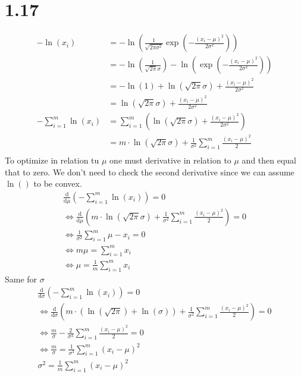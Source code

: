\documentclass[12pt,paper=a4,twoside]{scrartcl}
\begin{document}
\section*{1.17}
\begin{align*}   
     -\ln(x_i) &= -\ln\left( \frac{1}{\sqrt{2\pi\sigma^2}}\exp\left( -\frac{(x_i - \mu)^2}{2\sigma^2} \right) \right)\\   
     &= -\ln\left( \frac{1}{\sqrt{2\pi}\sigma}\right) - \ln\left(\exp\left(-\frac{(x_i -\mu)^2}{2\sigma^2}\right)\right)\\   
     &= -\ln(1) + \ln(\sqrt{2\pi}\sigma) + \frac{(x_i - \mu)^2}{2\sigma^2}\\   
     &= \ln(\sqrt{2\pi}\sigma) + \frac{(x_i - \mu)^2}{2\sigma^2}\\   
     -\sum_{i=1}^m \ln(x_i) &= \sum_{i=1}^m \left(\ln(\sqrt{2\pi}\sigma) + \frac{(x_i - \mu)^2}{2\sigma^2}\right)\\   
     &= m \cdot \ln(\sqrt{2\pi}\sigma) + \frac{1}{\sigma^2}\sum_{i=1}^m \frac{(x_i - \mu)^2}{2}\\   
     \end{align*}   
     To optimize in relation tu $\mu$ one must derivative in relation to $\mu$ and then equal that to zero.    
     We don't need to check the second derivative since we can assume $\ln()$ to be convex.   
     \begin{gather*}   
     \frac{\mathrm{d}}{\mathrm{d}\mu}\left(-\sum_{i=1}^m \ln(x_i)\right) = 0\\   
     \Leftrightarrow \frac{\mathrm{d}}{\mathrm{d}\mu} \left(m \cdot \ln(\sqrt{2\pi}\sigma) + \frac{1}{\sigma^2}\sum_{i=1}^m \frac{(x_i - \mu)^2}{2}\right) = 0\\   
     \Leftrightarrow\frac{1}{\sigma^2}\sum_{i=1}^m \mu - x_i = 0\\   
     \Leftrightarrow m\mu = \sum_{i=1}^m x_i\\   
     \Leftrightarrow\mu = \frac{1}{m}\sum_{i=1}^m x_i   
     \end{gather*}   
     Same for $\sigma$   
     \begin{gather*}   
     \frac{\mathrm{d}}{\mathrm{d}\sigma}\left(-\sum_{i=1}^m \ln(x_i)\right) = 0\\   
     \Leftrightarrow \frac{\mathrm{d}}{\mathrm{d}\sigma}\left( m \cdot (\ln(\sqrt{2\pi}) + \ln(\sigma)) + \frac{1}{\sigma^2}\sum_{i=1}^m \frac{(x_i - \mu)^2}{2} \right) = 0\\   
     \Leftrightarrow \frac{m}{\sigma} - \frac{2}{\sigma^3}\sum_{i=1}^m \frac{(x_i - \mu)^2}{2} = 0\\   
     \Leftrightarrow \frac{m}{\sigma} = \frac{1}{\sigma^3}\sum_{i=1}^m (x_i - \mu)^2\\   
     \sigma^2 = \frac{1}{m}\sum_{i=1}^m (x_i - \mu)^2   
     \end{gather*}
\end{document}
